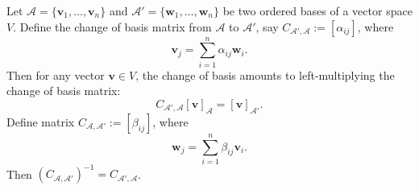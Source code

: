 \begin{proposition}\label{prop: change-of-basis}
Let \( \mathcal{A} = \{ \mathbf{v}_1, \ldots, \mathbf{v}_n \} \) and \( \mathcal{A}' = \{ \mathbf{w}_1, \ldots, \mathbf{w}_n \} \) be two ordered bases of a vector space \( V \). Define the change of basis matrix from \( \mathcal{A} \) to \( \mathcal{A}' \), say \( C_{\mathcal{A}',\mathcal{A}} := [\alpha_{ij}] \), where
\[
\mathbf{v}_j = \sum_{i=1}^n \alpha_{ij} \mathbf{w}_i.
\]
Then for any vector \( \mathbf{v} \in V \), the change of basis amounts to left-multiplying the change of basis matrix:
\begin{equation}\label{eq:change-basis}
C_{\mathcal{A}',\mathcal{A}}[\mathbf{v}]_{\mathcal{A}} = [\mathbf{v}]_{\mathcal{A}'}.
\end{equation}
Define matrix \( C_{\mathcal{A},\mathcal{A}'} := [\beta_{ij}] \), where
\[
\mathbf{w}_j = \sum_{i=1}^n \beta_{ij} \mathbf{v}_i.
\]
Then \( \left( C_{\mathcal{A},\mathcal{A}'} \right)^{-1} = C_{\mathcal{A}',\mathcal{A}} \).
\end{proposition}
